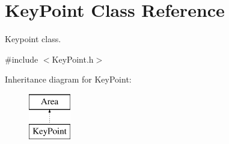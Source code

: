 \hypertarget{classKeyPoint}{}\section{Key\+Point Class Reference}
\label{classKeyPoint}


Keypoint class.  




{\ttfamily \#include $<$Key\+Point.\+h$>$}

Inheritance diagram for Key\+Point\+:\begin{figure}[H]
\begin{center}
\leavevmode
\includegraphics[height=2.000000cm]{classKeyPoint}
\end{center}
\end{figure}
